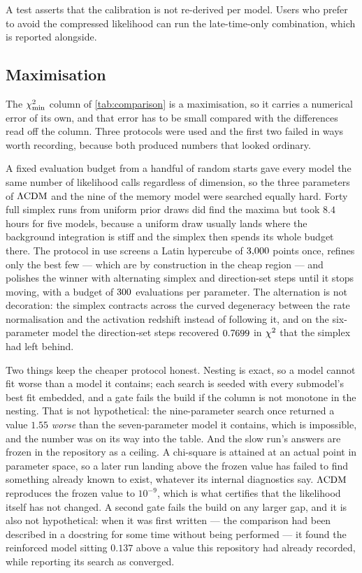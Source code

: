 A test asserts that the calibration is not re-derived per
model. Users who prefer to avoid the compressed likelihood can run the
late-time-only combination, which is reported alongside.

\subsection{Maximisation}\label{app:numerics-maximisation}

The $\chi^{2}_{\min}$ column of \cref{tab:comparison} is a maximisation, so it
carries a numerical error of its own, and that error has to be small compared
with the differences read off the column. Three protocols were used and the
first two failed in ways worth recording, because both produced numbers that
looked ordinary.

A fixed evaluation budget from a handful of random starts gave every model the
same number of likelihood calls regardless of dimension, so the three
parameters of $\Lambda\mathrm{CDM}$ and the nine of the memory model were searched equally
hard. Forty full simplex runs from uniform prior draws did find the maxima but
took $8.4$ hours for five models, because a uniform draw usually lands where
the background integration is stiff and the simplex then spends its whole
budget there. The protocol in use screens a Latin hypercube of
$3{,}000$ points once, refines only the best few --- which
are by construction in the cheap region --- and polishes the winner with
alternating simplex and direction-set steps until it stops moving, with a
budget of $300$ evaluations per parameter. The
alternation is not decoration: the simplex contracts across the curved
degeneracy between the rate normalisation and the activation redshift instead
of following it, and on the six-parameter model the direction-set steps
recovered $0.7699$ in $\chi^{2}$ that the simplex had left
behind.

Two things keep the cheaper protocol honest. Nesting is exact, so a model
cannot fit worse than a model it contains; each search is seeded with every
submodel's best fit embedded, and a gate fails the build if the column is not
monotone in the nesting. That is not hypothetical: the nine-parameter search
once returned a value $1.55$ \emph{worse} than the seven-parameter model it
contains, which is impossible, and the number was on its way into the table.
And the slow run's answers are frozen in the repository as a ceiling. A
chi-square is attained at an actual point in parameter space, so a later run
landing above the frozen value has failed to find something already known to
exist, whatever its internal diagnostics say. $\Lambda\mathrm{CDM}$ reproduces the frozen
value to $10^{-9}$, which is what certifies that the likelihood itself has not
changed. A second gate fails the build on any larger gap, and it is also not
hypothetical: when it was first written --- the comparison had been described
in a docstring for some time without being performed --- it found the
reinforced model sitting $0.137$ above a value this repository had already
recorded, while reporting its search as converged.

